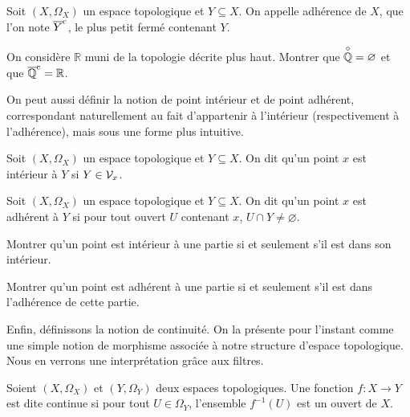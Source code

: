 \begin{definition}[Adhérence]
  Soit $(X,\Omega_X)$ un espace topologique et $Y\subseteq X$. On appelle
  adhérence de $X$, que l'on note $\overline{Y}^{\mathrm c}$, le plus petit fermé contenant
  $Y$.
\end{definition}

\begin{exercise}
  On considère $\mathbb R$ muni de la topologie décrite plus haut. Montrer que
  $\overset{\circ}{\mathbb Q} = \varnothing$ et que $\overline{\mathbb Q}^{\mathrm c} = \mathbb R$.
\end{exercise}

On peut aussi définir la notion de point intérieur et de point adhérent,
correspondant naturellement au fait d'appartenir à l'intérieur (respectivement à
l'adhérence), mais sous une forme plus intuitive.

\begin{definition}
  Soit $(X,\Omega_X)$ un espace topologique et $Y\subseteq X$. On dit qu'un
  point $x$ est intérieur à $Y$ si $Y\in\mathcal{V}_x$.
\end{definition}

\begin{definition}
  Soit $(X,\Omega_X)$ un espace topologique et $Y\subseteq X$. On dit qu'un
  point $x$ est adhérent à $Y$ si pour tout ouvert $U$ contenant $x$,
  $U\cap Y\neq \varnothing$.
\end{definition}

\begin{exercise}
  Montrer qu'un point est intérieur à une partie si et seulement s'il est dans
  son intérieur.
\end{exercise}

\begin{exercise}\label{exo.carac.adhe}
  Montrer qu'un point est adhérent à une partie si et seulement s'il est dans
  l'adhérence de cette partie.
\end{exercise}

Enfin, définissons la notion de continuité. On la présente pour l'instant comme
une simple notion de morphisme associée à notre structure d'espace topologique.
Nous en verrons une interprétation grâce aux filtres.

\begin{definition}
  Soient $(X,\Omega_X)$ et $(Y,\Omega_Y)$ deux espaces topologiques. Une
  fonction $f : X \to Y$ est dite continue si pour tout $U\in\Omega_Y$,
  l'ensemble $f^{-1}(U)$ est un ouvert de $X$.
\end{definition}

